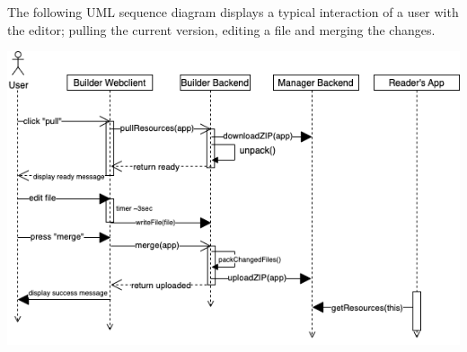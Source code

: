 The following UML sequence diagram displays a typical interaction of a user with the editor; pulling the current version, editing a file and merging the changes.

\includegraphics[width=\textwidth]{pics/user-flow.uml.drawio.png}